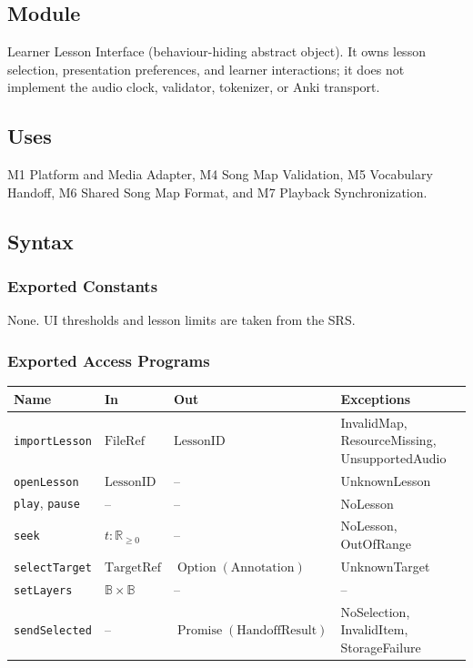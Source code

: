 \documentclass[12pt, titlepage]{article}
\begin{document}
\subsection{Module}
Learner Lesson Interface (behaviour-hiding abstract object). It owns
lesson selection, presentation preferences, and learner interactions;
it does not implement the audio clock, validator, tokenizer, or
Anki transport.

\subsection{Uses}
M1 Platform and Media Adapter, M4 Song Map Validation,
M5 Vocabulary Handoff, M6 Shared Song Map Format, and
M7 Playback Synchronization.

\subsection{Syntax}
\subsubsection{Exported Constants}
None. UI thresholds and lesson limits are taken from the SRS.

\subsubsection{Exported Access Programs}
\begin{center}
\small
\begin{tabularx}{\textwidth}{@{}p{}p{}p{}X@{}}
\toprule
\textbf{Name} & \textbf{In} & \textbf{Out} & \textbf{Exceptions}\\
\midrule
\texttt{importLesson} & $\mathrm{FileRef}$ &
$\mathrm{LessonID}$ & InvalidMap, ResourceMissing,
UnsupportedAudio\\
\texttt{openLesson} & $\mathrm{LessonID}$ & -- & UnknownLesson\\
\texttt{play}, \texttt{pause} & -- & -- & NoLesson\\
\texttt{seek} & $t:\mathbb{R}_{\geq0}$ & -- & NoLesson, OutOfRange\\
\texttt{selectTarget} & $\mathrm{TargetRef}$ &
$\operatorname{Option}(\mathrm{Annotation})$ & UnknownTarget\\
\texttt{setLayers} & $\mathbb{B}\times\mathbb{B}$ & -- & --\\
\texttt{sendSelected} & -- &
$\operatorname{Promise}(\mathrm{HandoffResult})$ &
NoSelection, InvalidItem, StorageFailure\\
\bottomrule
\end{tabularx}
\normalsize
\end{center}
\end{document}
